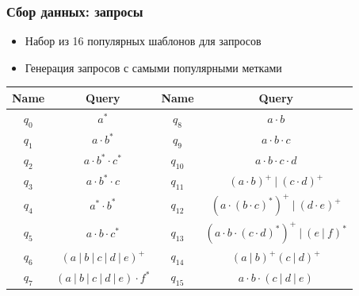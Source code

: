 \documentclass{beamer}
\begin{document}
\begin{frame}[fragile]
  \frametitle{Сбор данных: запросы}
  \begin{itemize}
    \item Набор из 16 популярных шаблонов для запросов
    \item Генерация запросов с самыми популярными метками
  \end{itemize}
  \vspace{10pt}
  \noindent\begin{minipage}{1
      \textwidth}
    \begin{table}[!ht]
      \centering
      \begin{tabular}{|c|c||c|c|}
        \hline
        Name  & Query                           & Name     & Query                                           \\ \hline \hline
        $q_0$ & $a^*$                           & $q_{8}$  & $a \cdot b$                                     \\
        $q_1$ & $a \cdot b^*$                   & $q_{9}$  & $a \cdot b \cdot c$                             \\
        $q_2$ & $a \cdot b^* \cdot c^*$         & $q_{10}$ & $a \cdot b \cdot c \cdot d$                     \\
        $q_3$ & $a \cdot b^* \cdot c$           & $q_{11}$ & $(a \cdot b)^+~|~(c \cdot d)^+$                 \\
        $q_4$ & $a^* \cdot b^*$                 & $q_{12}$ & $(a \cdot (b \cdot c)^*)^+~|~(d \cdot e)^+$     \\
        $q_5$ & $a \cdot b \cdot c^*$           & $q_{13}$ & $(a \cdot b \cdot (c \cdot d)^*)^+~|~(e~|~f)^*$ \\
        $q_6$ & $(a~|~b~|~c~|~d~|~e)^+$         & $q_{14}$ & $(a~|~b)^+ (c~|~d)^+$                           \\
        $q_7$ & $(a~|~b~|~c~|~d~|~e) \cdot f^*$ & $q_{15}$ & $a \cdot b \cdot (c~|~d~|~e)$                   \\
        \hline
      \end{tabular}
    \end{table}
  \end{minipage}
  \noindent\begin{minipage}{0.25\textwidth}
  \end{minipage}
\end{frame}
\end{document}
